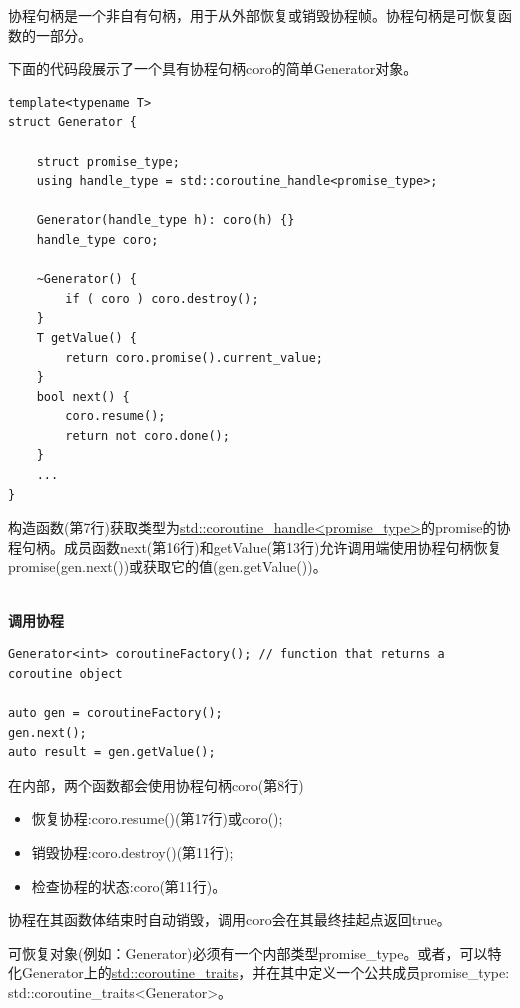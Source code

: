 协程句柄是一个非自有句柄，用于从外部恢复或销毁协程帧。协程句柄是可恢复函数的一部分。

下面的代码段展示了一个具有协程句柄coro的简单Generator对象。

\begin{lstlisting}[style=styleCXX]
template<typename T>
struct Generator {

	struct promise_type;
	using handle_type = std::coroutine_handle<promise_type>;
	
	Generator(handle_type h): coro(h) {}
	handle_type coro;
	
	~Generator() {
		if ( coro ) coro.destroy();
	}
	T getValue() {
		return coro.promise().current_value;
	}
	bool next() {
		coro.resume();
		return not coro.done();
	}
	...
}
\end{lstlisting}

构造函数(第7行)获取类型为\href{https://en.cppreference.com/w/cpp/coroutine/coroutine_handle}{std::coroutine\_handle<promise\_type>}的promise的协程句柄。成员函数next(第16行)和getValue(第13行)允许调用端使用协程句柄恢复promise(gen.next())或获取它的值(gen.getValue())。

\hspace*{\fill} \\ %
\noindent
\textbf{调用协程}
\begin{lstlisting}[style=styleCXX]
Generator<int> coroutineFactory(); // function that returns a coroutine object

auto gen = coroutineFactory();
gen.next();
auto result = gen.getValue();
\end{lstlisting}

在内部，两个函数都会使用协程句柄coro(第8行)

\begin{itemize}
\item 
恢复协程:coro.resume()(第17行)或coro();

\item 
销毁协程:coro.destroy()(第11行);

\item 
检查协程的状态:coro(第11行)。
\end{itemize}

协程在其函数体结束时自动销毁，调用coro会在其最终挂起点返回true。

\begin{tcolorbox}[breakable,enhanced jigsaw,colback=red!5!white,colframe=red!75!black,title={可恢复对象需要内部类型promise\_type}]
可恢复对象(例如：Generator)必须有一个内部类型promise\_type。或者，可以特化Generator上的\href{https://en.cppreference.com/w/cpp/coroutine/coroutine_traits}{std::coroutine\_traits}，并在其中定义一个公共成员promise\_type: std::coroutine\_traits<Generator>。
\end{tcolorbox}

